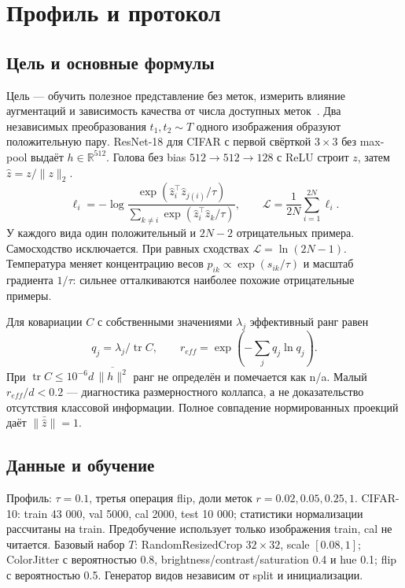 \section{Профиль и протокол}
\subsection{Цель и основные формулы}
Цель --- обучить полезное представление без меток, измерить влияние аугментаций и зависимость качества от числа доступных меток~\cite{teacher}. Два независимых преобразования $t_1,t_2\sim T$ одного изображения образуют положительную пару. ResNet-18 для CIFAR с первой свёрткой $3\times3$ без max-pool выдаёт $h\in\mathbb R^{512}$. Голова без bias $512\to512\to128$ с ReLU строит $z$, затем $\hat z=z/\|z\|_2$.
\begin{equation}\ell_i=-\log\frac{\exp(\hat z_i^\top\hat z_{j(i)}/\tau)}{\sum_{k\ne i}\exp(\hat z_i^\top\hat z_k/\tau)},\qquad \mathcal L=\frac1{2N}\sum_{i=1}^{2N}\ell_i.\end{equation}
У каждого вида один положительный и $2N-2$ отрицательных примера. Самосходство исключается. При равных сходствах $\mathcal L=\ln(2N-1)$. Температура меняет концентрацию весов $p_{ik}\propto\exp(s_{ik}/\tau)$ и масштаб градиента $1/\tau$: сильнее отталкиваются наиболее похожие отрицательные примеры.

Для ковариации $C$ с собственными значениями $\lambda_j$ эффективный ранг равен
\begin{equation}q_j=\lambda_j/\operatorname{tr}C,\qquad r_{eff}=\exp\left(-\sum_jq_j\ln q_j\right).\end{equation}
При $\operatorname{tr}C\le10^{-6}d\,\overline{\|h\|^2}$ ранг не определён и помечается как n/a. Малый $r_{eff}/d<0.2$ --- диагностика размерностного коллапса, а не доказательство отсутствия классовой информации. Полное совпадение нормированных проекций даёт $\|\bar{\hat z}\|=1$.

\subsection{Данные и обучение}
Профиль: $\tau=0.1$, третья операция flip, доли меток $r=0.02,0.05,0.25,1$. CIFAR-10: train 43 000, val 5000, cal 2000, test 10 000; статистики нормализации рассчитаны на train. Предобучение использует только изображения train, cal не читается. Базовый набор $T$: RandomResizedCrop $32\times32$, scale $[0.08,1]$; ColorJitter с вероятностью 0.8, brightness/contrast/saturation 0.4 и hue 0.1; flip с вероятностью 0.5. Генератор видов независим от split и инициализации.

